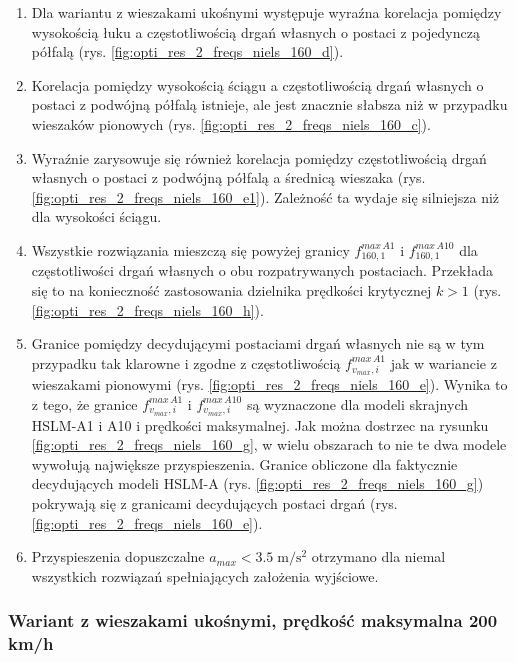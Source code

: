 \begin{enumerate}
	
	\item Dla wariantu z wieszakami ukośnymi występuje wyraźna korelacja pomiędzy wysokością łuku a częstotliwością drgań własnych o postaci z pojedynczą półfalą (rys. \ref{fig:opti_res_2_freqs_niels_160_d}).
	\item Korelacja pomiędzy wysokością ściągu a częstotliwością drgań własnych o postaci z podwójną półfalą istnieje, ale jest znacznie słabsza niż w przypadku wieszaków pionowych (rys. \ref{fig:opti_res_2_freqs_niels_160_c}).
	\item Wyraźnie zarysowuje się również korelacja pomiędzy częstotliwością drgań własnych o postaci z podwójną półfalą a średnicą wieszaka (rys. \ref{fig:opti_res_2_freqs_niels_160_e1}). Zależność ta wydaje się silniejsza niż dla wysokości ściągu.
	\item Wszystkie rozwiązania mieszczą się powyżej granicy $f_{160,1}^{max\,A1}$ i $f_{160,1}^{max\,A10}$ dla częstotliwości drgań własnych o obu rozpatrywanych postaciach. Przekłada się to na konieczność zastosowania dzielnika prędkości krytycznej $k>1$ (rys. \ref{fig:opti_res_2_freqs_niels_160_h}).
	\item  Granice pomiędzy decydującymi postaciami drgań własnych nie są w tym przypadku tak klarowne i zgodne z częstotliwością $f_{v_{max},i}^{max\,A1}$ jak w wariancie z wieszakami pionowymi (rys. \ref{fig:opti_res_2_freqs_niels_160_e}). Wynika to z tego, że granice $f_{v_{max},i}^{max\,A1}$ i $f_{v_{max},i}^{max\,A10}$ są wyznaczone dla modeli skrajnych HSLM-A1 i A10 i prędkości maksymalnej. Jak można dostrzec na rysunku \ref{fig:opti_res_2_freqs_niels_160_g}, w wielu obszarach to nie te dwa modele wywołują największe przyspieszenia. Granice obliczone dla faktycznie decydujących modeli HSLM-A (rys. \ref{fig:opti_res_2_freqs_niels_160_g}) pokrywają się z granicami decydujących postaci drgań (rys. \ref{fig:opti_res_2_freqs_niels_160_e}).
	\item Przyspieszenia dopuszczalne $a_{max}<3.5\;\mathrm{m/s^2}$ otrzymano dla niemal wszystkich rozwiązań spełniających założenia wyjściowe.
	
\end{enumerate}



\subsubsection{Wariant z wieszakami ukośnymi, prędkość maksymalna 200 km/h}

